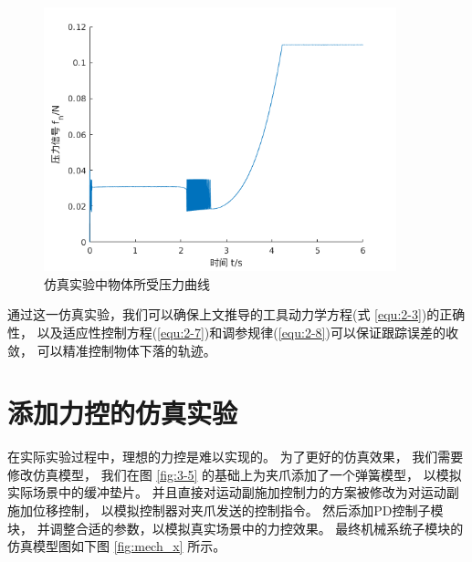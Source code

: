 \begin{figure}[!ht]
  \centering
  \includegraphics[width=10.2cm]{chapter04/pic/fn_f}
  \caption{\label{fig:fn_f}
    仿真实验中物体所受压力曲线}
  \vspace{-0.3cm}
\end{figure}


通过这一仿真实验，我们可以确保上文推导的工具动力学方程(式 \ref{equ:2-3})的正确性，
以及适应性控制方程(\ref{equ:2-7})和调参规律(\ref{equ:2-8})可以保证跟踪误差的收敛，
可以精准控制物体下落的轨迹。


\section{添加力控的仿真实验}
在实际实验过程中，理想的力控是难以实现的。
为了更好的仿真效果， 我们需要修改仿真模型，
我们在图 \ref{fig:3-5} 的基础上为夹爪添加了一个弹簧模型， 以模拟实际场景中的缓冲垫片。
并且直接对运动副施加控制力的方案被修改为对运动副施加位移控制，
以模拟控制器对夹爪发送的控制指令。
然后添加PD控制子模块， 并调整合适的参数，以模拟真实场景中的力控效果。
最终机械系统子模块的仿真模型图如下图 \ref{fig:mech_x} 所示。

